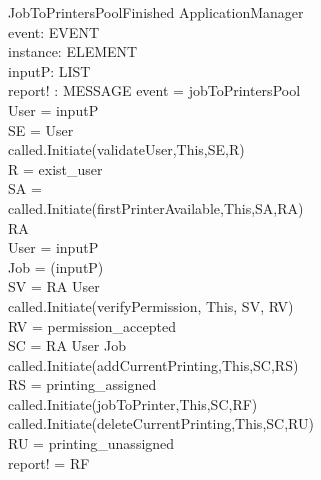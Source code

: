 \begin{schema}{JobToPrintersPoolFinished}
\Delta ApplicationManager \\
event: EVENT \\
instance: ELEMENT \\
inputP: LIST \\
report! : MESSAGE
\where event = jobToPrintersPool \\
User = \head inputP \\
SE = \lseq User \rseq \\
called.Initiate(validateUser,This,SE,R) \\
R = exist\_user \\
SA = \lseq  \rseq \\
called.Initiate(firstPrinterAvailable,This,SA,RA) \\
RA \neq \emptyset \\
User = \head inputP \\
Job = \head (\tail inputP) \\

SV = \lseq RA User \rseq \\
called.Initiate(verifyPermission, This, SV, RV) \\
RV = permission\_accepted \\

SC = \lseq RA User Job \rseq \\
called.Initiate(addCurrentPrinting,This,SC,RS) \\
RS = printing\_assigned \\

called.Initiate(jobToPrinter,This,SC,RF) \\

called.Initiate(deleteCurrentPrinting,This,SC,RU) \\
RU = printing\_unassigned \\

report! = RF
\end{schema}




